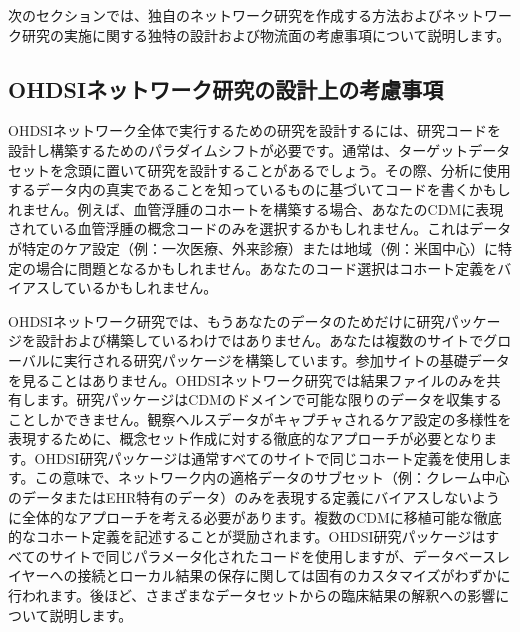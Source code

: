 \documentclass[
  11pt]{book}
\theoremstyle{definition}
\theoremstyle{definition}
\theoremstyle{definition}
\theoremstyle{definition}
\theoremstyle{remark}
\begin{document}
次のセクションでは、独自のネットワーク研究を作成する方法およびネットワーク研究の実施に関する独特の設計および物流面の考慮事項について説明します。

\subsection{OHDSIネットワーク研究の設計上の考慮事項}\label{ohdsiux30cdux30c3ux30c8ux30efux30fcux30afux7814ux7a76ux306eux8a2dux8a08ux4e0aux306eux8003ux616eux4e8bux9805}


OHDSIネットワーク全体で実行するための研究を設計するには、研究コードを設計し構築するためのパラダイムシフトが必要です。通常は、ターゲットデータセットを念頭に置いて研究を設計することがあるでしょう。その際、分析に使用するデータ内の真実であることを知っているものに基づいてコードを書くかもしれません。例えば、血管浮腫のコホートを構築する場合、あなたのCDMに表現されている血管浮腫の概念コードのみを選択するかもしれません。これはデータが特定のケア設定（例：一次医療、外来診療）または地域（例：米国中心）に特定の場合に問題となるかもしれません。あなたのコード選択はコホート定義をバイアスしているかもしれません。

OHDSIネットワーク研究では、もうあなたのデータのためだけに研究パッケージを設計および構築しているわけではありません。あなたは複数のサイトでグローバルに実行される研究パッケージを構築しています。参加サイトの基礎データを見ることはありません。OHDSIネットワーク研究では結果ファイルのみを共有します。研究パッケージはCDMのドメインで可能な限りのデータを収集することしかできません。観察ヘルスデータがキャプチャされるケア設定の多様性を表現するために、概念セット作成に対する徹底的なアプローチが必要となります。OHDSI研究パッケージは通常すべてのサイトで同じコホート定義を使用します。この意味で、ネットワーク内の適格データのサブセット（例：クレーム中心のデータまたはEHR特有のデータ）のみを表現する定義にバイアスしないように全体的なアプローチを考える必要があります。複数のCDMに移植可能な徹底的なコホート定義を記述することが奨励されます。OHDSI研究パッケージはすべてのサイトで同じパラメータ化されたコードを使用しますが、データベースレイヤーへの接続とローカル結果の保存に関しては固有のカスタマイズがわずかに行われます。後ほど、さまざまなデータセットからの臨床結果の解釈への影響について説明します。
\end{document}
